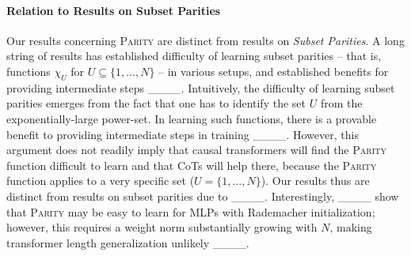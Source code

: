 \paragraph{Relation to Results on Subset Parities}
Our results concerning \textsc{Parity} are distinct from results on \emph{Subset Parities}.
A long string of results has established difficulty of learning subset parities -- that is, functions $\chi_U$ for $U \subseteq \{1, \dots, N\}$ -- in various setups, and established benefits for providing intermediate steps ____.
Intuitively, the difficulty of learning subset parities emerges from the fact that one has to identify the set $U$ from the exponentially-large power-set.
In learning such functions, there is a provable benefit to providing intermediate steps in training ____.
However, this argument does not readily imply that causal transformers will find the \textsc{Parity} function difficult to learn and that CoTs will help there, because the \textsc{Parity} function applies to a very specific set ($U = \{1, \dots, N\}$).
Our results thus are distinct from results on subset parities due to ____.
%
Interestingly, ____ show that \textsc{Parity} may be easy to learn for MLPs with Rademacher initialization; however, this requires a weight norm substantially growing with $N$, making transformer length generalization unlikely ____.

%


%
%
%
%
%
%
%
%
%
%
%
%
%
%


%
%
%



%


%

%

%


%


%


%
%
%

%

%

%

%


%

%
%


%



%
%
%
%
%
%


%
%
%
%
%
%
%